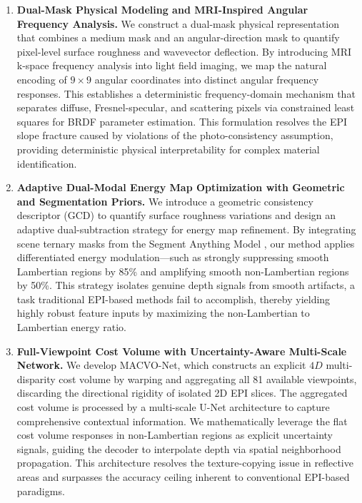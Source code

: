 \documentclass[lettersize,journal]{IEEEtran}
\begin{document}
\begin{enumerate}
    \item \textbf{Dual-Mask Physical Modeling and MRI-Inspired Angular Frequency Analysis.} We construct a dual-mask physical representation that combines a medium mask and an angular-direction mask to quantify pixel-level surface roughness and wavevector deflection. By introducing MRI k-space frequency analysis into light field imaging, we map the natural encoding of $9\times 9$ angular coordinates into distinct angular frequency responses. This establishes a deterministic frequency-domain mechanism that separates diffuse, Fresnel-specular, and scattering pixels via constrained least squares for BRDF parameter estimation. This formulation resolves the EPI slope fracture caused by violations of the photo-consistency assumption, providing deterministic physical interpretability for complex material identification. 
    
    \item \textbf{Adaptive Dual-Modal Energy Map Optimization with Geometric and Segmentation Priors.} We introduce a geometric consistency descriptor (GCD) to quantify surface roughness variations and design an adaptive dual-subtraction strategy for energy map refinement. By integrating scene ternary masks from the Segment Anything Model \cite{kirillov2023}, our method applies differentiated energy modulation—such as strongly suppressing smooth Lambertian regions by 85\% and amplifying smooth non-Lambertian regions by 50\%. This strategy isolates genuine depth signals from smooth artifacts, a task traditional EPI-based methods fail to accomplish, thereby yielding highly robust feature inputs by maximizing the non-Lambertian to Lambertian energy ratio.
    
    \item \textbf{Full-Viewpoint Cost Volume with Uncertainty-Aware Multi-Scale Network.} We develop MACVO-Net, which constructs an explicit $4D$ multi-disparity cost volume by warping and aggregating all 81 available viewpoints, discarding the directional rigidity of isolated 2D EPI slices. The aggregated cost volume is processed by a multi-scale U-Net \cite{ronneberger2015} architecture to capture comprehensive contextual information. We mathematically leverage the flat cost volume responses in non-Lambertian regions as explicit uncertainty signals, guiding the decoder to interpolate depth via spatial neighborhood propagation. This architecture resolves the texture-copying issue in reflective areas and surpasses the accuracy ceiling inherent to conventional EPI-based paradigms.
\end{enumerate}
\end{document}
